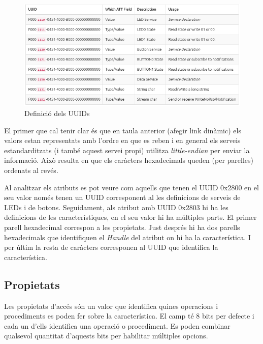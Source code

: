 \begin{figure}[h!]
	\begin{center}
		\includegraphics[width=\textwidth]{./images/Project_0_UUID.png}
		\caption{Definició dels UUIDs}
	\end{center}
\end{figure}

El primer que cal tenir clar és que en taula anterior (afegir link dinàmic) els valors estan representats amb l'ordre en que es reben i en general els serveis estandarditzats (i també aquest servei propi) utilitza \textit{little-endian} per enviar la informació.
Això resulta en que els caràcters hexadecimals queden (per parelles) ordenats al revés.

Al analitzar els atributs es pot veure com aquells que tenen el UUID 0x2800 en el seu valor només tenen un UUID corresponent al les definicions de serveis de LEDs i de botons.
Seguidament, als atribut amb UUID 0x2803 hi ha les definicions de les característiques, en el seu valor hi ha múltiples parts.
El primer parell hexadecimal correspon a les propietats. Just després hi ha dos parells hexadecimals que identifiquen el \textit{Handle} del atribut on hi ha la característica.
I per últim la resta de caràcters corresponen al UUID que identifica la característica.

\subsection{Propietats}
\label{sec:properties}
Les propietats d'accés són un valor que identifica quines operacions i procediments es poden fer sobre la característica.
El camp té 8 bits per defecte i cada un d'ells identifica una operació o procediment.
Es poden combinar qualsevol quantitat d'aquests bits per habilitar múltiples opcions.


